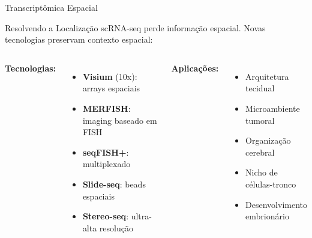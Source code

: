 \begin{frame}{Transcriptômica Espacial}
\begin{block}{Resolvendo a Localização}
scRNA-seq perde informação espacial. Novas tecnologias preservam contexto espacial:
\end{block}

\begin{columns}
\textbf{Tecnologias:}
\begin{itemize}
    \item \textbf{Visium} (10x): arrays espaciais
    \item \textbf{MERFISH}: imaging baseado em FISH
    \item \textbf{seqFISH+}: multiplexado
    \item \textbf{Slide-seq}: beads espaciais
    \item \textbf{Stereo-seq}: ultra-alta resolução
\end{itemize}

\textbf{Aplicações:}
\begin{itemize}
    \item Arquitetura tecidual
    \item Microambiente tumoral
    \item Organização cerebral
    \item Nicho de células-tronco
    \item Desenvolvimento embrionário
\end{itemize}
\end{columns}

\vspace{0.3cm}

\end{frame}

